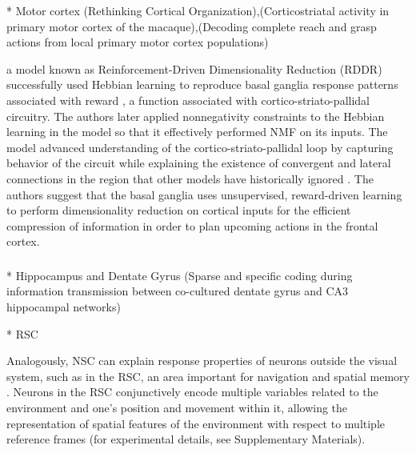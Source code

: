 * Motor cortex (Rethinking Cortical Organization),(Corticostriatal activity in primary motor cortex of the macaque),(Decoding complete reach and grasp actions from local primary motor cortex populations)


a model known as Reinforcement-Driven Dimensionality Reduction (RDDR)
successfully used Hebbian learning to reproduce basal ganglia response patterns associated with reward \cite{BarGad2000}, a function associated with cortico-striato-pallidal circuitry. The authors later applied nonnegativity constraints to the Hebbian learning in the model so that it effectively performed \ac{NMF} on its inputs. The model advanced understanding of the cortico-striato-pallidal loop by capturing behavior of the circuit while explaining the existence of convergent and lateral connections in the region that other models have historically ignored \cite{BarGad2003_Review}. The authors suggest that the basal ganglia uses unsupervised, reward-driven learning to perform dimensionality reduction on cortical inputs for the efficient compression of information in order to plan upcoming actions in the frontal cortex.


\subsubsection*{}
* Hippocampus and Dentate Gyrus (Sparse and specific coding during information transmission between co-cultured dentate gyrus and CA3 hippocampal networks)

* RSC


Analogously, \ac{NSC} can explain response properties
of neurons outside the visual system, 
such as in the \acf{RSC}, an area important for navigation and spatial memory \cite{Miller2014,Nelson2015,VannAggleton2009}.
Neurons in the \ac{RSC} conjunctively encode multiple variables related to the environment and one's position and movement within it, allowing the representation of spatial features of the environment with respect to multiple reference frames \cite{AlexanderNitz2015} (for experimental details, see Supplementary Materials). 



